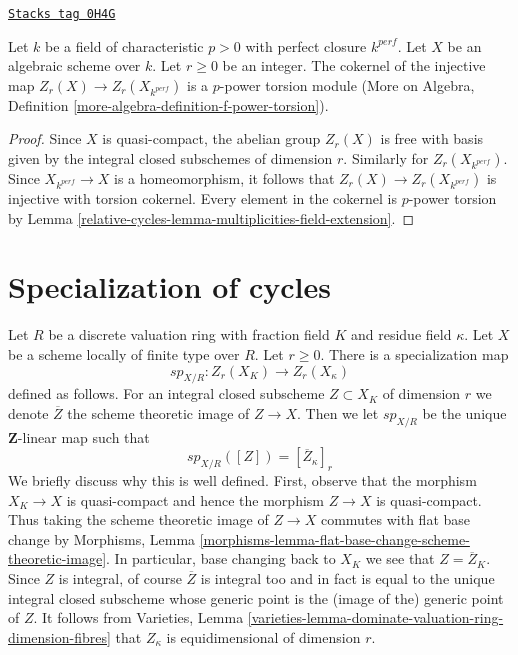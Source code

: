 \begin{lemma}
\label{relative-cycles-lemma-how-different}
\href{https://stacks.math.columbia.edu/tag/0H4G}{\texttt{Stacks tag 0H4G}}

Let $k$ be a field of characteristic $p > 0$ with perfect closure $k^{perf}$.
Let $X$ be an algebraic scheme over $k$. Let $r \geq 0$ be an integer.
The cokernel of the injective map $Z_r(X) \to Z_r(X_{k^{perf}})$ is a
$p$-power torsion module (More on Algebra, Definition
\ref{more-algebra-definition-f-power-torsion}).
\end{lemma}

\begin{proof}
Since $X$ is quasi-compact, the abelian group $Z_r(X)$ is free with basis
given by the integral closed subschemes of dimension $r$. Similarly for
$Z_r(X_{k^{perf}})$.
Since $X_{k^{perf}} \to X$ is a homeomorphism, it follows
that $Z_r(X) \to Z_r(X_{k^{perf}})$ is injective with torsion cokernel.
Every element in the cokernel is $p$-power torsion by
Lemma \ref{relative-cycles-lemma-multiplicities-field-extension}.
\end{proof}

\section{Specialization of cycles}
\label{relative-cycles-section-specialization}
Let $R$ be a discrete valuation ring with fraction field $K$
and residue field $\kappa$. Let $X$ be a scheme locally of finite type
over $R$. Let $r \geq 0$. There is a specialization map
$$
sp_{X/R} : Z_r(X_K) \longrightarrow Z_r(X_\kappa)
$$
defined as follows. For an integral closed subscheme $Z \subset X_K$
of dimension $r$ we denote $\overline{Z}$ the scheme theoretic image
of $Z \to X$. Then we let $sp_{X/R}$ be the unique $\mathbf{Z}$-linear
map such that
$$
sp_{X/R}([Z]) = [\overline{Z}_\kappa]_r
$$
We briefly discuss why this is well defined. First, observe that the
morphism $X_K \to X$ is quasi-compact and hence the morphism $Z \to X$
is quasi-compact. Thus taking the scheme theoretic image of $Z \to X$
commutes with flat base change by
Morphisms, Lemma \ref{morphisms-lemma-flat-base-change-scheme-theoretic-image}.
In particular, base changing back to $X_K$ we see that $Z = \overline{Z}_K$.
Since $Z$ is integral, of course $\overline{Z}$ is integral too and
in fact is equal to the unique integral closed subscheme whose generic
point is the (image of the) generic point of $Z$. It follows from
Varieties, Lemma \ref{varieties-lemma-dominate-valuation-ring-dimension-fibres}
that $Z_\kappa$ is equidimensional of dimension $r$.

